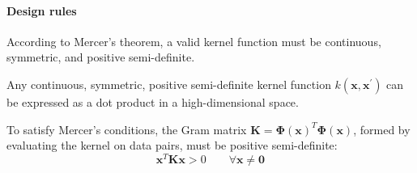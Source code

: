 \paragraph*{Design rules}
According to Mercer's theorem, a valid kernel function must be continuous, symmetric, and positive semi-definite. 
\begin{theorem}[Mercer]
    Any continuous, symmetric, positive semi-definite kernel function $k(\mathbf{x},\mathbf{x}^\prime)$ can be expressed as a dot product in a high-dimensional space. 
\end{theorem}
To satisfy Mercer's conditions, the Gram matrix $\mathbf{K}=\boldsymbol{\Phi}{(\mathbf{x})}^T\boldsymbol{\Phi}(\mathbf{x})$, formed by evaluating the kernel on data pairs, must be positive semi-definite:
\[\mathbf{x}^T\mathbf{K}\mathbf{x}>0\qquad\forall\mathbf{x}\neq\mathbf{0}\]


